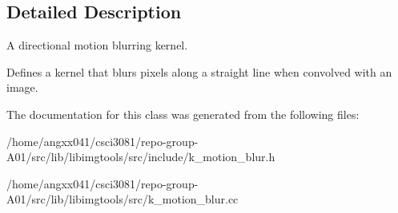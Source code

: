 \subsection{Detailed Description}
A directional motion blurring kernel. 

Defines a kernel that blurs pixels along a straight line when convolved with an image. 

The documentation for this class was generated from the following files\+:\begin{DoxyCompactItemize}
\item 
/home/angxx041/csci3081/repo-\/group-\/\+A01/src/lib/libimgtools/src/include/k\+\_\+motion\+\_\+blur.\+h\item 
/home/angxx041/csci3081/repo-\/group-\/\+A01/src/lib/libimgtools/src/k\+\_\+motion\+\_\+blur.\+cc\end{DoxyCompactItemize}
